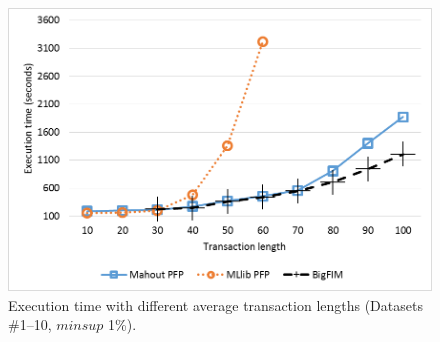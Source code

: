 




\begin{figure}[!t]
\includegraphics[width=5in]{chapters/survey/immagini/attributes.png}
\caption{Execution time with different average transaction lengths
(Datasets \#1--10, $minsup$ 1\%).}
\label{attributes}
\end{figure}

